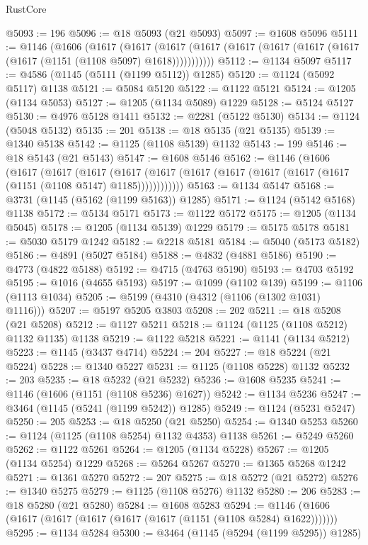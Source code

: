 \begin{lexlean}{RustCore}
\begin{coremodule}
@5093 := 196
@5096 := @18 @5093 (@21 @5093)
@5097 := @1608 @5096
@5111 := @1146
    (@1606
      (@1617
        (@1617
          (@1617 (@1617 (@1617 (@1617 (@1617 (@1617 (@1617 (@1151 (@1108 @5097) @1618)))))))))))
@5112 := @1134 @5097
@5117 := @4586 (@1145 (@5111 (@1199 @5112)) @1285)
@5120 := @1124 (@5092 @5117) @1138
@5121 := @5084 @5120
@5122 := @1122 @5121
@5124 := @1205 (@1134 @5053)
@5127 := @1205 (@1134 @5089) @1229
@5128 := @5124 @5127
@5130 := @4976 @5128 @1411
@5132 := @2281 (@5122 @5130)
@5134 := @1124 (@5048 @5132)
@5135 := 201
@5138 := @18 @5135 (@21 @5135)
@5139 := @1340 @5138
@5142 := @1125 (@1108 @5139) @1132
@5143 := 199
@5146 := @18 @5143 (@21 @5143)
@5147 := @1608 @5146
@5162 := @1146
    (@1606
      (@1617
        (@1617
          (@1617
            (@1617 (@1617 (@1617 (@1617 (@1617 (@1617 (@1617 (@1151 (@1108 @5147) @1185))))))))))))
@5163 := @1134 @5147
@5168 := @3731 (@1145 (@5162 (@1199 @5163)) @1285)
@5171 := @1124 (@5142 @5168) @1138
@5172 := @5134 @5171
@5173 := @1122 @5172
@5175 := @1205 (@1134 @5045)
@5178 := @1205 (@1134 @5139) @1229
@5179 := @5175 @5178
@5181 := @5030 @5179 @1242
@5182 := @2218 @5181
@5184 := @5040 (@5173 @5182)
@5186 := @4891 (@5027 @5184)
@5188 := @4832 (@4881 @5186)
@5190 := @4773 (@4822 @5188)
@5192 := @4715 (@4763 @5190)
@5193 := @4703 @5192
@5195 := @1016 (@4655 @5193)
@5197 := @1099 (@1102 @139)
@5199 := @1106 (@1113 @1034)
@5205 := @5199 (@4310 (@4312 (@1106 (@1302 @1031) @1116)))
@5207 := @5197 @5205 @3803
@5208 := 202
@5211 := @18 @5208 (@21 @5208)
@5212 := @1127 @5211
@5218 := @1124 (@1125 (@1108 @5212) @1132 @1135) @1138
@5219 := @1122 @5218
@5221 := @1141 (@1134 @5212)
@5223 := @1145 (@3437 @4714)
@5224 := 204
@5227 := @18 @5224 (@21 @5224)
@5228 := @1340 @5227
@5231 := @1125 (@1108 @5228) @1132
@5232 := 203
@5235 := @18 @5232 (@21 @5232)
@5236 := @1608 @5235
@5241 := @1146 (@1606 (@1151 (@1108 @5236) @1627))
@5242 := @1134 @5236
@5247 := @3464 (@1145 (@5241 (@1199 @5242)) @1285)
@5249 := @1124 (@5231 @5247)
@5250 := 205
@5253 := @18 @5250 (@21 @5250)
@5254 := @1340 @5253
@5260 := @1124 (@1125 (@1108 @5254) @1132 @4353) @1138
@5261 := @5249 @5260
@5262 := @1122 @5261
@5264 := @1205 (@1134 @5228)
@5267 := @1205 (@1134 @5254) @1229
@5268 := @5264 @5267
@5270 := @1365 @5268 @1242
@5271 := @1361 @5270
@5272 := 207
@5275 := @18 @5272 (@21 @5272)
@5276 := @1340 @5275
@5279 := @1125 (@1108 @5276) @1132
@5280 := 206
@5283 := @18 @5280 (@21 @5280)
@5284 := @1608 @5283
@5294 := @1146 (@1606 (@1617 (@1617 (@1617 (@1617 (@1617 (@1151 (@1108 @5284) @1622)))))))
@5295 := @1134 @5284
@5300 := @3464 (@1145 (@5294 (@1199 @5295)) @1285)

\end{coremodule}
\end{lexlean}
